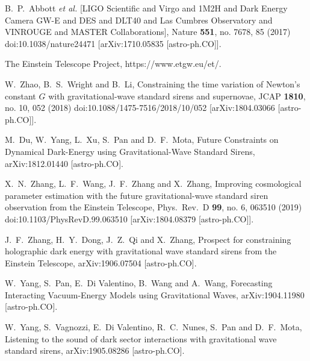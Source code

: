 \documentclass[aps,prd,nofootinbib,amsmath,amssymb,superscriptaddress,twocolumn,10pt]{revtex4}%
\begin{document}
\begin{thebibliography}{99}
  B.~P.~Abbott {\it et al.} [LIGO Scientific and Virgo and 1M2H and Dark Energy Camera GW-E and DES and DLT40 and Las Cumbres Observatory and VINROUGE and MASTER Collaborations],
  Nature {\bf 551}, no. 7678, 85 (2017)
  doi:10.1038/nature24471
  [arXiv:1710.05835 [astro-ph.CO]].

The Einstein Telescope Project,
https://www.etgw.eu/et/.


  W.~Zhao, B.~S.~Wright and B.~Li,
  Constraining the time variation of Newton's constant $G$ with gravitational-wave standard sirens and supernovae,
  JCAP {\bf 1810}, no. 10, 052 (2018)
  doi:10.1088/1475-7516/2018/10/052
  [arXiv:1804.03066 [astro-ph.CO]].

  M.~Du, W.~Yang, L.~Xu, S.~Pan and D.~F.~Mota,
  Future Constraints on Dynamical Dark-Energy using Gravitational-Wave Standard Sirens,
  arXiv:1812.01440 [astro-ph.CO].

  X.~N.~Zhang, L.~F.~Wang, J.~F.~Zhang and X.~Zhang,
  Improving cosmological parameter estimation with the future gravitational-wave standard siren observation from the Einstein Telescope,
  Phys.\ Rev.\ D {\bf 99}, no. 6, 063510 (2019)
  doi:10.1103/PhysRevD.99.063510
  [arXiv:1804.08379 [astro-ph.CO]].

  J.~F.~Zhang, H.~Y.~Dong, J.~Z.~Qi and X.~Zhang,
  Prospect for constraining holographic dark energy with gravitational wave standard sirens from the Einstein Telescope,
  arXiv:1906.07504 [astro-ph.CO].

  W.~Yang, S.~Pan, E.~Di Valentino, B.~Wang and A.~Wang,
  Forecasting Interacting Vacuum-Energy Models using Gravitational Waves,
  arXiv:1904.11980 [astro-ph.CO].

  W.~Yang, S.~Vagnozzi, E.~Di Valentino, R.~C.~Nunes, S.~Pan and D.~F.~Mota,
  Listening to the sound of dark sector interactions with gravitational wave standard sirens,
  arXiv:1905.08286 [astro-ph.CO].


\end{thebibliography}
\end{document}
